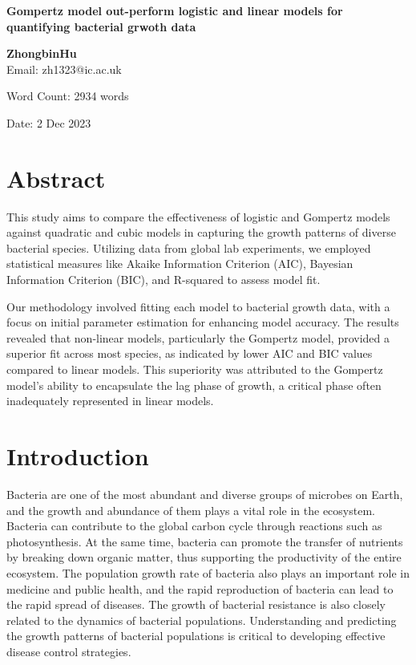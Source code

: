 \documentclass{article}
\begin{document}
\begin{titlepage}
    \begin{center}
        \vspace*{1cm}
        
        \Large
        \textbf{Gompertz model out-perform logistic and linear models for quantifying bacterial grwoth data}
        
        \vspace{1.5cm}
        
        \textbf{ZhongbinHu}\\
        Email: zh1323@ic.ac.uk
        
        \vfill
        
        Word Count: 2934 words
        
        \vspace{0.8cm}
        
        \Large
        Date: 2 Dec 2023
        
    \end{center}
\end{titlepage}


\onehalfspacing
\section{Abstract}
This study aims to compare the effectiveness of logistic and Gompertz models against quadratic and cubic models in capturing the growth patterns of diverse bacterial species.  Utilizing data from global lab experiments, we employed statistical measures like Akaike Information Criterion (AIC), Bayesian Information Criterion (BIC), and R-squared to assess model fit.

Our methodology involved fitting each model to bacterial growth data, with a focus on initial parameter estimation for enhancing model accuracy.  The results revealed that non-linear models, particularly the Gompertz model, provided a superior fit across most species, as indicated by lower AIC and BIC values compared to linear models.  This superiority was attributed to the Gompertz model's ability to encapsulate the lag phase of growth, a critical phase often inadequately represented in linear models.
\section{Introduction}
Bacteria are one of the most abundant and diverse groups of microbes on Earth, and the growth and abundance of them plays a vital role in the ecosystem. Bacteria can contribute to the global carbon cycle through reactions such as photosynthesis. At the same time, bacteria can promote the transfer of nutrients by breaking down organic matter, thus supporting the productivity of the entire ecosystem\cite{keller2006}. The population growth rate of bacteria also plays an important role in medicine and public health, and the rapid reproduction of bacteria can lead to the rapid spread of diseases. The growth of bacterial resistance is also closely related to the dynamics of bacterial populations\cite{rivera-tapia2003}. Understanding and predicting the growth patterns of bacterial populations is critical to developing effective disease control strategies.
\end{document}
